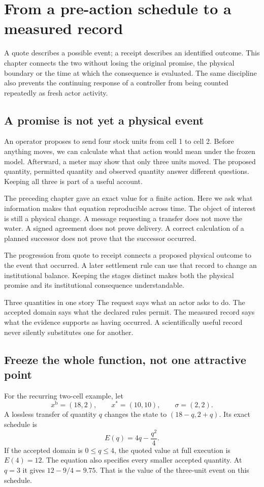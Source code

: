 \chapter{From a pre-action schedule to a measured record}\label{ch:lifecycle}

A quote describes a possible event; a receipt describes an identified outcome. This chapter connects the two without losing the original promise, the physical boundary or the time at which the consequence is evaluated. The same discipline also prevents the continuing response of a controller from being counted repeatedly as fresh actor activity.


\section{A promise is not yet a physical event}
An operator proposes to send four stock units from cell 1 to cell 2. Before anything moves, we can calculate what that action would mean under the frozen model. Afterward, a meter may show that only three units moved. The proposed quantity, permitted quantity and observed quantity answer different questions. Keeping all three is part of a useful account.

The preceding chapter gave an exact value for a finite action. Here we ask what information makes that equation reproducible across time. The object of interest is still a physical change. A message requesting a transfer does not move the water. A signed agreement does not prove delivery. A correct calculation of a planned successor does not prove that the successor occurred.

The progression from quote to receipt connects a proposed physical outcome to the event that occurred. A later settlement rule can use that record to change an institutional balance. Keeping the stages distinct makes both the physical promise and its institutional consequence understandable.

\begin{intuitionbox}{Three quantities in one story}
The request says what an actor asks to do. The accepted domain says what the declared rules permit. The measured record says what the evidence supports as having occurred. A scientifically useful record never silently substitutes one for another.
\end{intuitionbox}

\section{Freeze the whole function, not one attractive point}
For the recurring two-cell example, let
\[
 x^{\mathrm{b}}=(18,2),\qquad x^*=(10,10),\qquad \sigma=(2,2).
\]
A lossless transfer of quantity $q$ changes the state to $(18-q,2+q)$. Its exact schedule is
\begin{equation}
 E(q)=4q-\frac{q^2}{4}.
\end{equation}
If the accepted domain is $0\le q\le4$, the quoted value at full execution is $E(4)=12$. The equation also specifies every smaller accepted quantity. At $q=3$ it gives $12-9/4=9.75$. That is the value of the three-unit event on this schedule.

